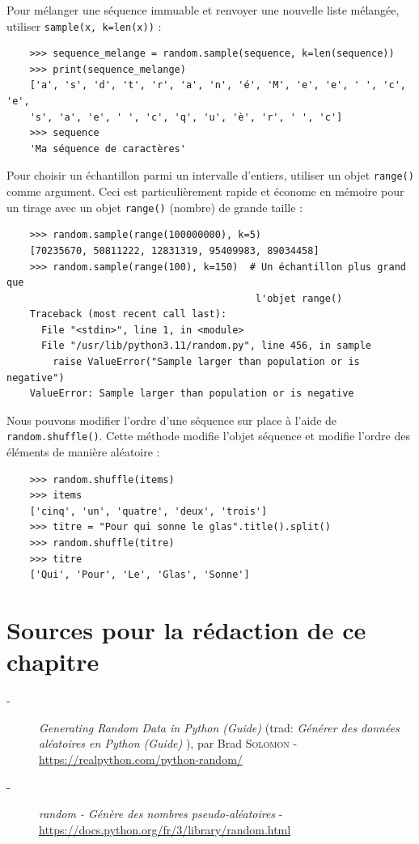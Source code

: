 \documentclass[a4paper,12pt]{book}
\begin{document}
Pour mélanger une séquence immuable et renvoyer une nouvelle liste mélangée, utiliser \texttt{sample(x, k=len(x))} :
\begin{verbatim}
    >>> sequence_melange = random.sample(sequence, k=len(sequence))
    >>> print(sequence_melange)
    ['a', 's', 'd', 't', 'r', 'a', 'n', 'é', 'M', 'e', 'e', ' ', 'c', 'e', 
    's', 'a', 'e', ' ', 'c', 'q', 'u', 'è', 'r', ' ', 'c']
    >>> sequence
    'Ma séquence de caractères'
\end{verbatim}
\medskip
Pour choisir un échantillon parmi un intervalle d'entiers, utiliser un objet \texttt{range()} comme argument. Ceci est particulièrement rapide et économe en mémoire pour un tirage avec un objet \texttt{range()} (nombre) de grande taille :
\begin{verbatim}
    >>> random.sample(range(100000000), k=5)
    [70235670, 50811222, 12831319, 95409983, 89034458]
    >>> random.sample(range(100), k=150)  # Un échantillon plus grand que 
                                           l'objet range()
    Traceback (most recent call last):
      File "<stdin>", line 1, in <module>
      File "/usr/lib/python3.11/random.py", line 456, in sample
        raise ValueError("Sample larger than population or is negative")
    ValueError: Sample larger than population or is negative
\end{verbatim} 
\medskip

Nous pouvons modifier l'ordre d'une séquence sur place à l'aide de \texttt{random.shuffle()}. Cette méthode modifie l'objet séquence et modifie l'ordre des éléments de manière aléatoire :
\begin{verbatim}
    >>> random.shuffle(items)
    >>> items
    ['cinq', 'un', 'quatre', 'deux', 'trois']
    >>> titre = "Pour qui sonne le glas".title().split()
    >>> random.shuffle(titre)
    >>> titre
    ['Qui', 'Pour', 'Le', 'Glas', 'Sonne']
\end{verbatim}
\medskip

\section*{Sources pour la rédaction de ce chapitre}
\begin{description}
	\item[-] \textit{Generating Random Data in Python (Guide)} (trad: \og \textit{Générer des données aléatoires en Python (Guide)} \fg{}), par Brad \textsc{Solomon} - \url{https://realpython.com/python-random/}
	\item[-] \textit{random - Génère des nombres pseudo-aléatoires} - \url{https://docs.python.org/fr/3/library/random.html}
\end{description}
\medskip
\end{document}
